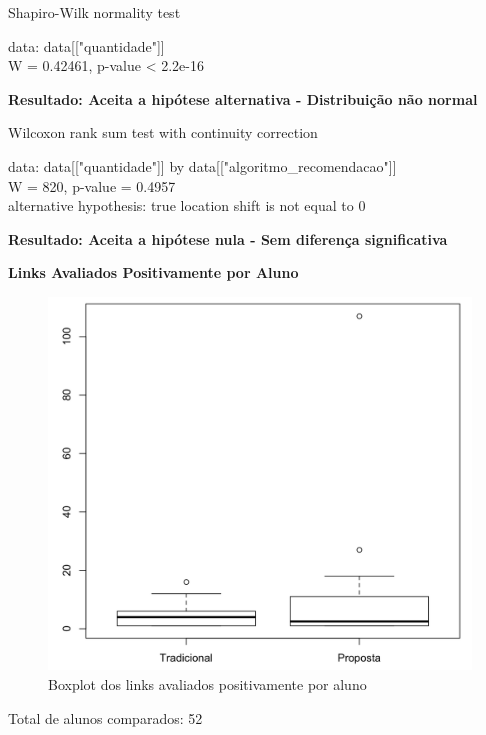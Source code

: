 Shapiro-Wilk normality test

\noindent
data:  data[["quantidade"]]\\
W = 0.42461, p-value < 2.2e-16

\textbf{Resultado: Aceita a hipótese alternativa - Distribuição não normal}

Wilcoxon rank sum test with continuity correction

\noindent
data:  data[["quantidade"]] by data[["algoritmo\_recomendacao"]]\\
W = 820, p-value = 0.4957\\
alternative hypothesis: true location shift is not equal to 0

\textbf{Resultado: Aceita a hipótese nula - Sem diferença significativa}

\textbf{Links Avaliados Positivamente por Aluno}

\begin{figure}[htb]
  \caption{\label{fig:avaliados-positivamente-boxplot}Boxplot dos links avaliados positivamente por aluno}
  \begin{center}
      \includegraphics[scale=0.4]{./Figuras/avaliados-positivamente-boxplot.png}
  \end{center}
\end{figure}

Total de alunos comparados: 52

